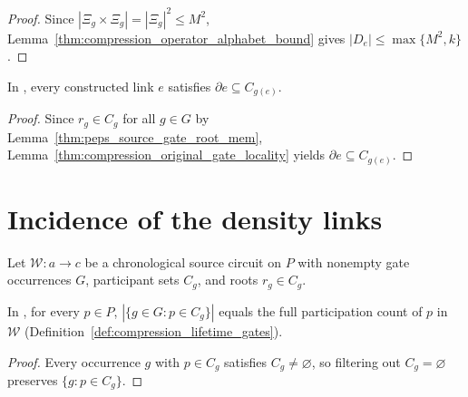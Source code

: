 \begin{proof}
    \leanok
    Since $|\Xi_g\times\Xi_g|=|\Xi_g|^2\le M^2$,
    Lemma~\ref{thm:compression_operator_alphabet_bound} gives
    $|D_e|\le\max\{M^2,k\}$.
\end{proof}

\begin{lemma}
    \label{thm:peps_source_density_link_locality}
    \leanok
    In \cite[proof of Theorem~5.2]{OpenAI2026PolynomialPEPS}, every constructed
    link $e$ satisfies $\partial e\subseteq C_{g(e)}$.
\end{lemma}

\begin{proof}
    \leanok
    Since $r_g\in C_g$ for all $g\in G$ by Lemma~\ref{thm:peps_source_gate_root_mem},
    Lemma~\ref{thm:compression_original_gate_locality} yields
    $\partial e\subseteq C_{g(e)}$.
\end{proof}

\section{Incidence of the density links}
\label{sec:peps_source_density_link_incidence}

Let $\mathcal W:a\to c$ be a chronological source circuit on $P$ with nonempty
gate occurrences $G$, participant sets $C_g$, and roots $r_g\in C_g$.

\begin{lemma}
    \label{thm:peps_nonempty_gate_participation}
    \leanok
    In \cite[proof of Theorem~5.2]{OpenAI2026PolynomialPEPS}, for every $p\in P$,
    $|\{g\in G:p\in C_g\}|$ equals the full participation count of $p$ in
    $\mathcal W$ (Definition~\ref{def:compression_lifetime_gates}).
\end{lemma}

\begin{proof}
    \leanok
    Every occurrence $g$ with $p\in C_g$ satisfies $C_g\neq\varnothing$, so
    filtering out $C_g=\varnothing$ preserves $\{g:p\in C_g\}$.
\end{proof}

